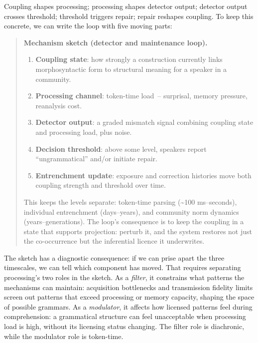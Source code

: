 Coupling shapes processing; processing shapes detector output; detector output crosses threshold; threshold triggers repair; repair reshapes coupling. To keep this concrete, we can write the loop with five moving parts:
\begin{quote}
\textbf{Mechanism sketch (detector and maintenance loop).}
\begin{enumerate}
    \item \textbf{Coupling state}: how strongly a construction currently links morphosyntactic form to structural meaning for a speaker in a community.
    \item \textbf{Processing channel}: token-time load~-- surprisal, memory pressure, reanalysis cost.
    \item \textbf{Detector output}: a graded mismatch signal combining coupling state and processing load, plus noise.
    \item \textbf{Decision threshold}: above some level, speakers report \enquote{ungrammatical} and/or initiate repair.
    \item \textbf{Entrenchment update}: exposure and correction histories move both coupling strength and threshold over time.
\end{enumerate}
This keeps the levels separate: token-time parsing (\textasciitilde100 ms--seconds), individual entrenchment (days--years), and community norm dynamics (years--generations). The loop's consequence is to keep the coupling in a state that supports projection: perturb it, and the system restores not just the co-occurrence but the inferential licence it underwrites.
\end{quote}

The sketch has a diagnostic consequence: if we can prise apart the three timescales, we can tell which component has moved. That requires separating processing's two roles in the sketch. As a \emph{filter}, it constrains what patterns the mechanisms can maintain: acquisition bottlenecks and transmission fidelity limits screen out patterns that exceed processing or memory capacity, shaping the space of possible grammars. As a \emph{modulator}, it affects how licensed patterns feel during comprehension: a grammatical structure can feel unacceptable when processing load is high, without its licensing status changing. The filter role is diachronic, while the modulator role is token-time.

